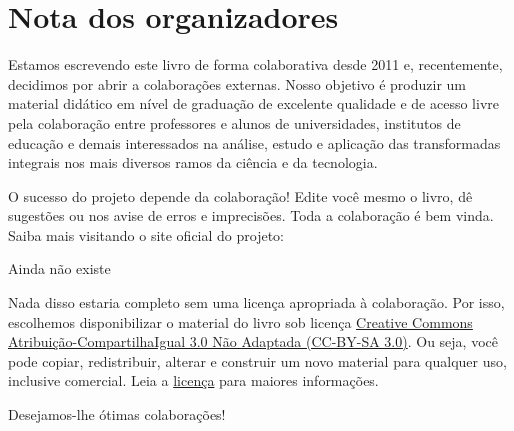 
\chapter*{Nota dos organizadores}

Estamos escrevendo este livro de forma colaborativa desde 2011 e, recentemente, decidimos por abrir a colaborações externas. Nosso objetivo é produzir um material didático em nível de graduação de excelente qualidade e de acesso livre pela colaboração entre professores e alunos de universidades, institutos de educação e demais interessados na análise, estudo e aplicação das transformadas integrais nos mais diversos ramos da ciência e da tecnologia.

O sucesso do projeto depende da colaboração! Edite você mesmo o livro, dê sugestões ou nos avise de erros e imprecisões. Toda a colaboração é bem vinda. Saiba mais visitando o site oficial do projeto:
\begin{center}
  Ainda não existe
\end{center}


Nada disso estaria completo sem uma licença apropriada à colaboração. Por isso, escolhemos disponibilizar o material do livro sob licença \href{https://creativecommons.org/licenses/by-sa/3.0/}{Creative Commons Atribuição-CompartilhaIgual 3.0 Não Adaptada (CC-BY-SA 3.0)}. Ou seja, você pode copiar, redistribuir, alterar e construir um novo material para qualquer uso, inclusive comercial. Leia a \href{https://creativecommons.org/licenses/by-sa/3.0/}{licença} para maiores informações.

\vspace{0.5cm}

Desejamos-lhe ótimas colaborações!


